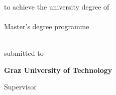 \begin{titlepage} %

\centering
\large


\vspace*{2cm}

\LARGE{\authorname}

\vspace*{1.2cm} 

{
\emph{\huge \drafttext}
\textbf{\huge \titlename}
}

\vspace{1.7cm}

\Large{\textbf{\thesistext}}\\\vspace*{0.3cm}
\large
to achieve the university degree of\\\offsetII
\titletext{\gender}\\

{
\vspace*{1cm}
Master's degree programme\\ \offsetII
\mastersProgramme\\
}


\vspace*{1.5cm}

submitted to\\\vspace*{0.1cm}

\Large{\textbf{Graz University of Technology}}\\


\large
{Supervisor}\\
\offsetIII
\supervisorI\\
\offsetII
\addressI\\
\offsetIII
\supervisorII\\
\offsetII
\addressII

\vfill

\normalsize \phddate\\
\end{titlepage}

\restoregeometry


